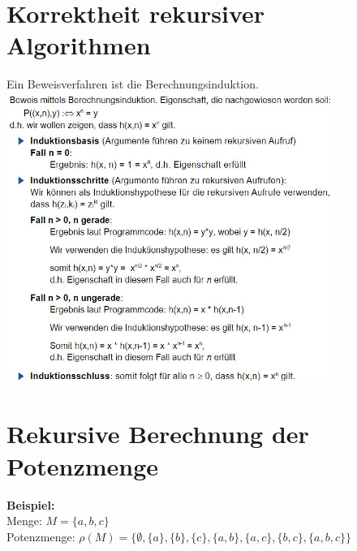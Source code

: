 \documentclass{scrreprt}
\begin{document}
\section{Korrektheit rekursiver Algorithmen}
Ein Beweisverfahren ist die Berechnungsinduktion.
\\\includegraphics[width=0.8\textwidth]{graphics/3-2Korrektheit}
\section{Rekursive Berechnung der Potenzmenge}
\textbf{Beispiel:}
\\Menge: $M =\{a,b,c\}$
\\Potenzmenge: $\rho (M) = \{ \emptyset, \{a\}, \{b\}, \{c\}, \{a,b\}, \{a,c\}, \{b,c\}, \{a,b,c\} \}$
\end{document}
